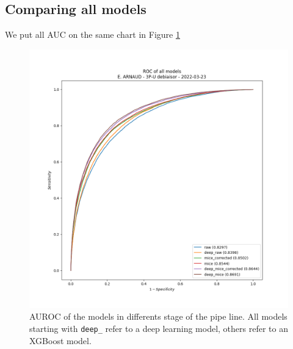 \documentclass{article}
\begin{document}
        \subsection{Comparing all models}
            We put all AUC on the same chart in Figure \ref{fig:all_models}
            \begin{figure}
                \includegraphics[width=\textwidth]{../archived/all_models.png}
                \caption{AUROC of the models in differents stage of the pipe line. All models starting with \texttt{deep\_} refer to a deep learning model, others refer to an XGBoost model.}
                \label{fig:all_models}
            \end{figure}
\end{document}
